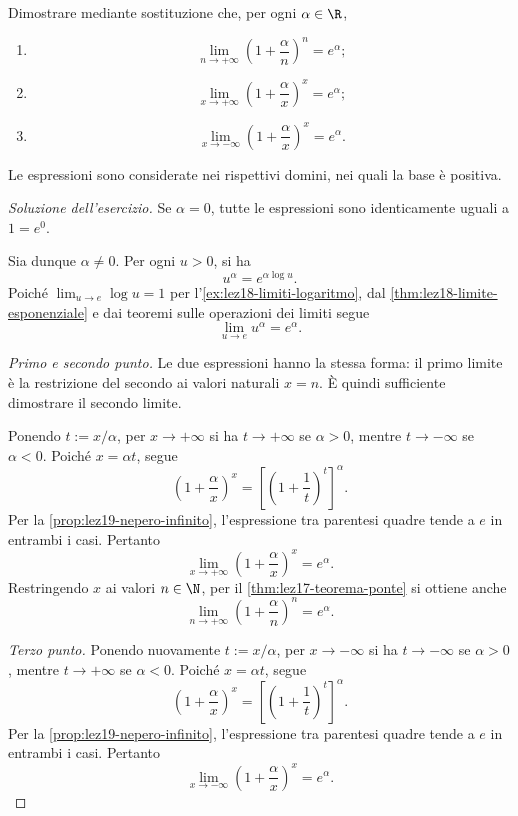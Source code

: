 \begin{exercise}
\label{ex:lez19-limiti-parametro}
Dimostrare mediante sostituzione che, per ogni
\(\alpha\in\R\),
\begin{enumerate}
  \item
  \[
    \lim_{n\to+\infty}
      \left(1+\frac\alpha n\right)^n=e^\alpha;
  \]
  \item
  \[
    \lim_{x\to+\infty}
      \left(1+\frac\alpha x\right)^x=e^\alpha;
  \]
  \item
  \[
    \lim_{x\to-\infty}
      \left(1+\frac\alpha x\right)^x=e^\alpha.
  \]
\end{enumerate}
Le espressioni sono considerate nei rispettivi domini,
nei quali la base è positiva.
\end{exercise}


\begin{proof}[Soluzione dell'esercizio]
Se \(\alpha=0\), tutte le espressioni sono
identicamente uguali a \(1=e^0\).

Sia dunque \(\alpha\ne0\). Per ogni \(u>0\), si ha
\[
  u^\alpha=e^{\alpha\log u}.
\]
Poiché \(\lim_{u\to e}\log u=1\) per
l'\cref{ex:lez18-limiti-logaritmo}, dal
\cref{thm:lez18-limite-esponenziale} e dai teoremi
sulle operazioni dei limiti segue
\[
  \lim_{u\to e}u^\alpha=e^\alpha.
\]

\emph{Primo e secondo punto.}
Le due espressioni hanno la stessa forma: il primo
limite è la restrizione del secondo ai valori
naturali \(x=n\). È quindi sufficiente dimostrare
il secondo limite.

Ponendo \(t:=x/\alpha\), per \(x\to+\infty\)
si ha \(t\to+\infty\) se \(\alpha>0\),
mentre \(t\to-\infty\) se \(\alpha<0\).
Poiché \(x=\alpha t\), segue
\[
  \left(1+\frac\alpha x\right)^x
  =\left[\left(1+\frac1t\right)^t\right]^\alpha.
\]
Per la \cref{prop:lez19-nepero-infinito},
l'espressione tra parentesi quadre tende a \(e\)
in entrambi i casi. Pertanto
\[
  \lim_{x\to+\infty}
    \left(1+\frac\alpha x\right)^x=e^\alpha.
\]
Restringendo \(x\) ai valori \(n\in\N\), per il
\cref{thm:lez17-teorema-ponte} si ottiene anche
\[
  \lim_{n\to+\infty}
    \left(1+\frac\alpha n\right)^n=e^\alpha.
\]

\emph{Terzo punto.}
Ponendo nuovamente \(t:=x/\alpha\), per
\(x\to-\infty\) si ha \(t\to-\infty\) se
\(\alpha>0\), mentre \(t\to+\infty\) se
\(\alpha<0\). Poiché \(x=\alpha t\), segue
\[
  \left(1+\frac\alpha x\right)^x
  =\left[\left(1+\frac1t\right)^t\right]^\alpha.
\]
Per la \cref{prop:lez19-nepero-infinito},
l'espressione tra parentesi quadre tende a \(e\)
in entrambi i casi. Pertanto
\[
  \lim_{x\to-\infty}
    \left(1+\frac\alpha x\right)^x=e^\alpha.
\]
\end{proof}

